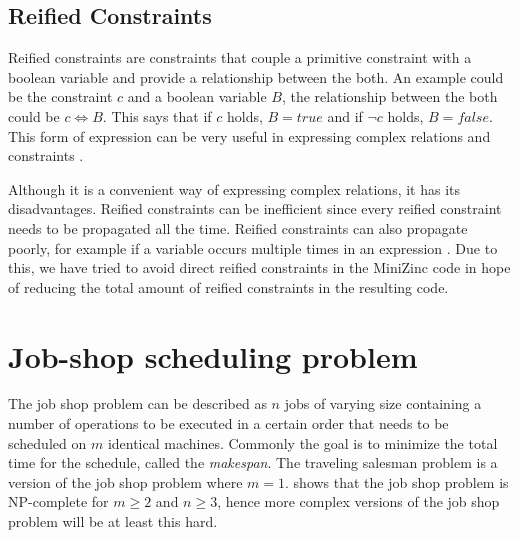 \cite{tsang_1993}
\cite{marriott_1998}
\cite{mz_manual}

\subsection{Reified Constraints}
Reified constraints are constraints that couple a primitive constraint with a boolean variable and provide a relationship between the both. An example could be the constraint $c$ and a boolean variable $B$, the relationship between the both could be $c \Leftrightarrow B$. This says that if $c$ holds, $B = true$ and if $\neg c$ holds, $B = false$. This form of expression can be very useful in expressing complex relations and constraints \cite{marriott_1998}.

Although it is a convenient way of expressing complex relations, it has its disadvantages. Reified constraints can be inefficient since every reified constraint needs to be propagated all the time. Reified constraints can also propagate poorly, for example if a variable occurs multiple times in an expression \cite{jefferson_2010}. Due to this, we have tried to avoid direct reified constraints in the MiniZinc code in hope of reducing the total amount of reified constraints in the resulting code.

\section{Job-shop scheduling problem}
The job shop problem can be described as $n$ jobs of varying size containing a number of operations to be executed in a certain order that needs to be scheduled on $m$ identical machines. Commonly the goal is to minimize the total time for the schedule, called the \emph{makespan}. The traveling salesman problem is a version of the job shop problem where $m = 1$. \cite{garey_1976} shows that the job shop problem is NP-complete for $m \geq 2$ and $n \geq 3$, hence more complex versions of the job shop problem will be at least this hard.

